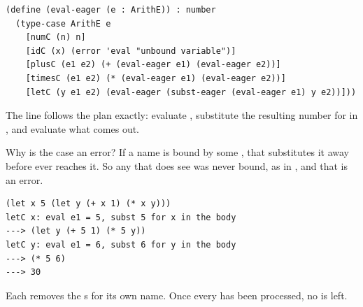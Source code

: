 \begin{lstlisting}
(define (eval-eager (e : ArithE)) : number
  (type-case ArithE e
    [numC (n) n]
    [idC (x) (error 'eval "unbound variable")]
    [plusC (e1 e2) (+ (eval-eager e1) (eval-eager e2))]
    [timesC (e1 e2) (* (eval-eager e1) (eval-eager e2))]
    [letC (y e1 e2) (eval-eager (subst-eager (eval-eager e1) y e2))]))
\end{lstlisting}
The  line follows the plan exactly: evaluate , substitute the resulting number for  in , and evaluate what comes out.

Why is the  case an error? If a name is bound by some , that  substitutes it away before  ever reaches it. So any  that  does see was never bound, as in , and that is an error.
\begin{lstlisting}[style=repl]
(let x 5 (let y (+ x 1) (* x y)))
letC x: eval e1 = 5, subst 5 for x in the body
---> (let y (+ 5 1) (* 5 y))
letC y: eval e1 = 6, subst 6 for y in the body
---> (* 5 6)
---> 30
\end{lstlisting}
Each  removes the s for its own name. Once every  has been processed, no  is left.
